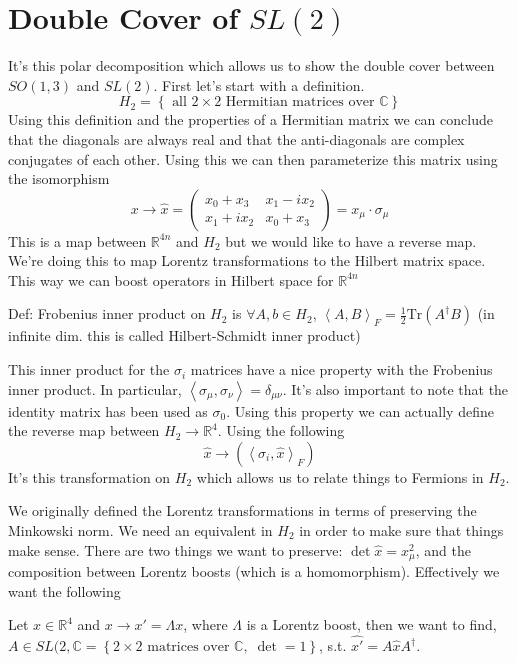 \section{Double Cover of $SL(2)$}
It's this polar decomposition which allows us to show the double cover between $SO(1,3)$ and
$SL(2)$. First let's start with a definition.
$$
    H_2 = \left\{ \text{ all } 2\times2 \text{ Hermitian matrices over } \mathbb{C}\right\}
$$
Using this definition and the properties of a Hermitian matrix we can conclude
that the diagonals are always real and that the anti-diagonals are complex conjugates
of each other. Using this we can then parameterize this matrix using the isomorphism
$$
    x \rightarrow \hat{x} = 
    \begin{pmatrix} x_0 + x_3 & x_1 - i x_2 \\ x_1 + i x_2 & x_0 + x_3 \end{pmatrix} =
    x_{\mu} \cdot \sigma_{\mu}
$$
This is a map between $\mathbb{R}^{4n}$ and $H_2$ but we would like to have a reverse
map. We're doing this to map Lorentz transformations to the Hilbert matrix space. This
way we can boost operators in Hilbert space for $\mathbb{R}^{4n}$

Def: Frobenius inner product on $H_2$ is $\forall A, b \in H_2$,
$\left<A, B\right>_{F} = \frac{1}{2} \text{Tr}\left(A^\dagger B\right)$
{\color{red}(in infinite dim. this is called Hilbert-Schmidt inner product)}

This inner product for the $\sigma_i$ matrices have a nice property with the
Frobenius inner product. In particular,
$\left<\sigma_{\mu}, \sigma_{\nu}\right> = \delta_{\mu \nu}$. It's also important to note
that the identity matrix has been used as $\sigma_0$.
Using this property we can actually define the reverse map between 
$H_2 \rightarrow \mathbb{R}^{4}$.
Using the following 
$$
    \hat{x} \rightarrow \left(\left<\sigma_i, \hat{x}\right>_{F}\right)
$$
It's this transformation on $H_2$ which allows us to relate things to Fermions
in $H_2$.

We originally defined the Lorentz transformations in terms of preserving the Minkowski
norm. We need an equivalent in $H_2$ in order to make sure that things make sense. There
are two things we want to preserve: $\det \hat{x} = x_{\mu}^2$, and the composition
between Lorentz boosts (which is a homomorphism). Effectively we want the following

Let $x \in \mathbb{R}^4$ and $x \rightarrow x' = \Lambda x$, where $\Lambda$ is a 
Lorentz boost, then we want to find, 
$A \in SL(2, \mathbb{C} = 
\left\{ 2 \times 2 \text{ matrices over } \mathbb{C},\; \det = 1 \right\}$, s.t.
$\hat{x'} = A \hat{x} A^\dagger$.

